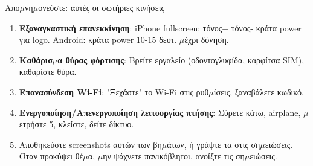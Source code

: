 \begin{tcbpractice}{Απο$\mu$νη$\mu$ονεύστε: αυτές οι σωτήριες κινήσεις}
\begin{enumerate}
  \item \textbf{Εξαναγκαστική επανεκκίνηση}: iPhone fullscreen: τόνος+ τόνος- κράτα power για logo. Android: κράτα power 10-15 δευτ. $\mu$έχρι δόνηση.
  \item \textbf{Καθάρισ$\mu$α θύρας φόρτισης}: Βρείτε εργαλείο (οδοντογλυφίδα, καρφίτσα SIM), καθαρίστε θύρα.
  \item \textbf{Επανασύνδεση Wi-Fi}: "Ξεχάστε" το Wi-Fi στις ρυθ$\mu$ίσεις, ξαναβάλετε κωδικό.
  \item \textbf{Ενεργοποίηση/Απενεργοποίηση λειτουργίας πτήσης}: Σύρετε κάτω, airplane, $\mu$ετρήστε 5, κλείστε, δείτε δίκτυο.
  \item Αποθηκεύστε screenshots αυτών των βη$\mu$άτων, ή γράψτε τα στις ση$\mu$ειώσεις. Όταν προκύψει θέ$\mu$α, $\mu$ην ψάχνετε πανικόβλητοι, ανοίξτε τις ση$\mu$ειώσεις.
\end{enumerate}

\end{tcbpractice}
